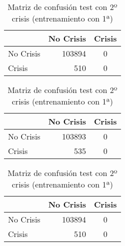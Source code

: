 \begin{table}
\begin{center}
\begin{subtable}[c]{0.4\textwidth}
\begin{tabular}{lrc}
                 & No Crisis & Crisis \\
                \hline
                No Crisis & 103894 & 0 \\
                Crisis & 510 & 0\\
                \hline
            \end{tabular}
            \label{tab:mat-conf-stats-1.7}
        \end{subtable}
        \begin{subtable}[c]{0.4\textwidth}
            \begin{tabular}{lrc}
                \hline
                 & No Crisis & Crisis \\
                \hline
                No Crisis & 103893 & 0 \\
                Crisis & 535 & 0\\
                \hline
            \end{tabular}
            \label{tab:mat-conf-raw-1.7}
        \end{subtable}
        \hspace{1em}\vspace{1em}
        \begin{subtable}[c]{0.4\textwidth}
                \begin{tabular}{lrc}
                \hline
                 & No Crisis & Crisis \\
                \hline
                No Crisis & 103894 & 0 \\
                Crisis & 510 & 0\\
                \hline
            \end{tabular}
            \label{tab:mat-conf-stats-1.8}
        \end{subtable}
        \caption{Matriz de confusión test con 2º crisis (entrenamiento con 1ª)}
        \label{tab:matriz-test-2a}
    \end{center}
\end{table}

